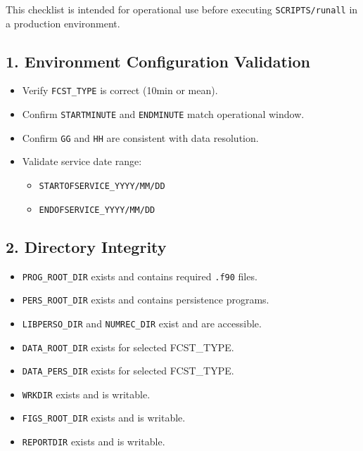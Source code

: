 \documentclass[a4paper,11pt]{article}
\begin{document}
This checklist is intended for operational use before executing 
\texttt{SCRIPTS/runall} in a production environment.

\subsection{1. Environment Configuration Validation}

\begin{itemize}
    \item [ ] Verify \texttt{FCST\_TYPE} is correct (10min or mean).
    \item [ ] Confirm \texttt{STARTMINUTE} and \texttt{ENDMINUTE} match operational window.
    \item [ ] Confirm \texttt{GG} and \texttt{HH} are consistent with data resolution.
    \item [ ] Validate service date range:
        \begin{itemize}
            \item [ ] \texttt{STARTOFSERVICE\_YYYY/MM/DD}
            \item [ ] \texttt{ENDOFSERVICE\_YYYY/MM/DD}
        \end{itemize}
\end{itemize}

\subsection{2. Directory Integrity}

\begin{itemize}
    \item [ ] \texttt{PROG\_ROOT\_DIR} exists and contains required \texttt{.f90} files.
    \item [ ] \texttt{PERS\_ROOT\_DIR} exists and contains persistence programs.
    \item [ ] \texttt{LIBPERSO\_DIR} and \texttt{NUMREC\_DIR} exist and are accessible.
    \item [ ] \texttt{DATA\_ROOT\_DIR} exists for selected FCST\_TYPE.
    \item [ ] \texttt{DATA\_PERS\_DIR} exists for selected FCST\_TYPE.
    \item [ ] \texttt{WRKDIR} exists and is writable.
    \item [ ] \texttt{FIGS\_ROOT\_DIR} exists and is writable.
    \item [ ] \texttt{REPORTDIR} exists and is writable.
\end{itemize}
\end{document}
